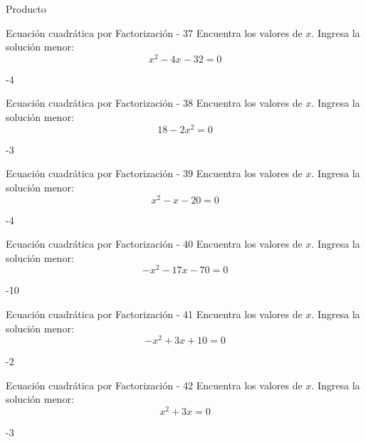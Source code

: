 \documentclass[a4,11pt]{aleph-notas}
\begin{document}
\begin{quiz}{Producto}
\begin{numerical}[]%
    {Ecuación cuadrática por Factorización - 37}
    Encuentra los valores de $x$. Ingresa la solución menor:
    \[
        x^{2} - 4 x - 32 = 0
    \]
    \item[] -4
\end{numerical}

\begin{numerical}[]%
    {Ecuación cuadrática por Factorización - 38}
    Encuentra los valores de $x$. Ingresa la solución menor:
    \[
        18 - 2 x^{2} = 0
    \]
    \item[] -3
\end{numerical}

\begin{numerical}[]%
    {Ecuación cuadrática por Factorización - 39}
    Encuentra los valores de $x$. Ingresa la solución menor:
    \[
        x^{2} - x - 20 = 0
    \]
    \item[] -4
\end{numerical}

\begin{numerical}[]%
    {Ecuación cuadrática por Factorización - 40}
    Encuentra los valores de $x$. Ingresa la solución menor:
    \[
        - x^{2} - 17 x - 70 = 0
    \]
    \item[] -10
\end{numerical}

\begin{numerical}[]%
    {Ecuación cuadrática por Factorización - 41}
    Encuentra los valores de $x$. Ingresa la solución menor:
    \[
        - x^{2} + 3 x + 10 = 0
    \]
    \item[] -2
\end{numerical}

\begin{numerical}[]%
    {Ecuación cuadrática por Factorización - 42}
    Encuentra los valores de $x$. Ingresa la solución menor:
    \[
        x^{2} + 3 x = 0
    \]
    \item[] -3
\end{numerical}


\end{quiz}
\end{document}
